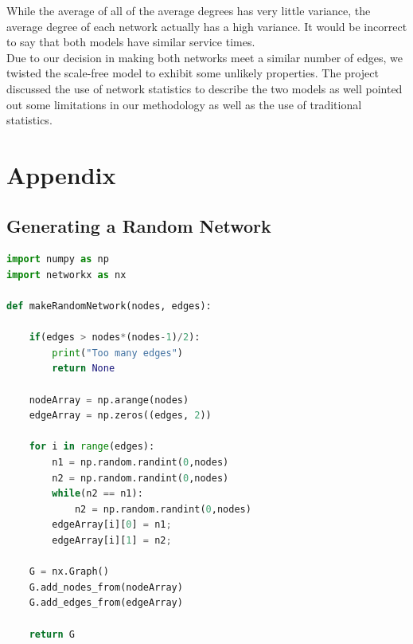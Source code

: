 \documentclass[journal]{IEEEtran}
\begin{document}
\noindent While the average of all of the average degrees has very little variance, the average degree of each network actually has a high variance. It would be incorrect to say that both models have similar service times. \\

\noindent Due to our decision in making both networks meet a similar number of edges, we twisted the scale-free model to exhibit some unlikely properties. The project discussed the use of network statistics to describe the two models as well pointed out some limitations in our methodology as well as the use of traditional statistics.

\printbibliography


\newpage
\onecolumn
\section{Appendix}

\subsection{Generating a Random Network}
\begin{lstlisting}[language=Python]
import numpy as np
import networkx as nx

def makeRandomNetwork(nodes, edges):

    if(edges > nodes*(nodes-1)/2):
        print("Too many edges")
        return None

    nodeArray = np.arange(nodes)
    edgeArray = np.zeros((edges, 2))

    for i in range(edges):
        n1 = np.random.randint(0,nodes)
        n2 = np.random.randint(0,nodes)
        while(n2 == n1):
            n2 = np.random.randint(0,nodes)
        edgeArray[i][0] = n1;
        edgeArray[i][1] = n2;

    G = nx.Graph()
    G.add_nodes_from(nodeArray)
    G.add_edges_from(edgeArray)

    return G
\end{lstlisting}
\end{document}
